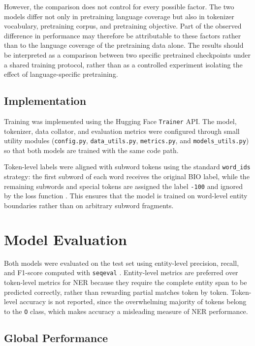 However, the comparison does not control for every possible factor. The two models differ not only in pretraining language coverage but also in tokenizer vocabulary, pretraining corpus, and pretraining objective. Part of the observed difference in performance may therefore be attributable to these factors rather than to the language coverage of the pretraining data alone. The results should be interpreted as a comparison between two specific pretrained checkpoints under a shared training protocol, rather than as a controlled experiment isolating the effect of language-specific pretraining.

\subsection{Implementation}
\label{subsec:train-impl}

Training was implemented using the Hugging Face \texttt{Trainer} API. The model, tokenizer, data collator, and evaluation metrics were configured through small utility modules (\texttt{config.py}, \texttt{data\_utils.py}, \texttt{metrics.py}, and \texttt{models\_utils.py}) so that both models are trained with the same code path.

Token-level labels were aligned with subword tokens using the standard \texttt{word\_ids} strategy: the first subword of each word receives the original BIO label, while the remaining subwords and special tokens are assigned the label \texttt{-100} and ignored by the loss function \cite{devlin2019bert}. This ensures that the model is trained on word-level entity boundaries rather than on arbitrary subword fragments.

\section{Model Evaluation}
\label{sec:eval}

Both models were evaluated on the test set using entity-level precision, recall, and F1-score computed with \texttt{seqeval} \cite{ramshaw1999conll,seqeval}. Entity-level metrics are preferred over token-level metrics for NER because they require the complete entity span to be predicted correctly, rather than rewarding partial matches token by token. Token-level accuracy is not reported, since the overwhelming majority of tokens belong to the \texttt{O} class, which makes accuracy a misleading measure of NER performance.

\subsection{Global Performance}
\label{subsec:eval-global}

